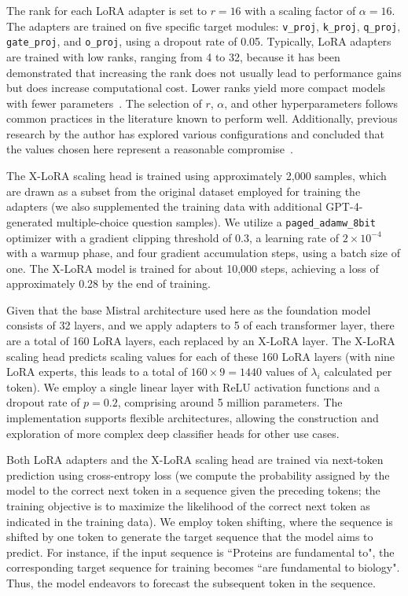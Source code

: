 The rank for each LoRA adapter is set to $r=16$ with a scaling factor of $\alpha=16$. The adapters are trained on five specific target modules: \texttt{v\_proj}, \texttt{k\_proj}, \texttt{q\_proj}, \texttt{gate\_proj}, and \texttt{o\_proj}, using a dropout rate of 0.05. Typically, LoRA adapters are trained with low ranks, ranging from 4 to 32, because it has been demonstrated that increasing the rank does not usually lead to performance gains but does increase computational cost. Lower ranks yield more compact models with fewer parameters~\cite{hu2021lora}. The selection of $r$, $\alpha$, and other hyperparameters follows common practices in the literature known to perform well. Additionally, previous research by the author has explored various configurations and concluded that the values chosen here represent a reasonable compromise~\cite{Luu2023BioinspiredLLM:Materials}.

The X-LoRA scaling head is trained using approximately 2,000 samples, which are drawn as a subset from the original dataset employed for training the adapters (we also supplemented the training data with additional GPT-4-generated multiple-choice question samples). We utilize a \texttt{paged\_adamw\_8bit} optimizer with a gradient clipping threshold of 0.3, a learning rate of $2\times 10^{-4}$ with a warmup phase, and four gradient accumulation steps, using a batch size of one. The X-LoRA model is trained for about 10,000 steps, achieving a loss of approximately 0.28 by the end of training.

Given that the base Mistral architecture used here as the foundation model consists of 32 layers, and we apply adapters to 5 of each transformer layer, there are a total of 160 LoRA layers, each replaced by an X-LoRA layer. The X-LoRA scaling head predicts scaling values for each of these 160 LoRA layers (with nine LoRA experts, this leads to a total of $160\times 9=1440$ values of $\lambda_i$ calculated per token). We employ a single linear layer with ReLU activation functions and a dropout rate of $p=0.2$, comprising around 5 million parameters. The implementation supports flexible architectures, allowing the construction and exploration of more complex deep classifier heads for other use cases.

Both LoRA adapters and the X-LoRA scaling head are trained via next-token prediction using cross-entropy loss (we compute the probability assigned by the model to the correct next token in a sequence given the preceding tokens; the training objective is to maximize the likelihood of the correct next token as indicated in the training data). We employ token shifting, where the sequence is shifted by one token to generate the target sequence that the model aims to predict. For instance, if the input sequence is ``Proteins are fundamental to", the corresponding target sequence for training becomes ``are fundamental to biology". Thus, the model endeavors to forecast the subsequent token in the sequence.

